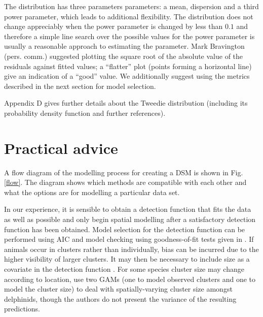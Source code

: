 \documentclass[a4paper,12pt]{article}
\begin{document}
The distribution has three parameters parameters: a mean, dispersion and a third power parameter, which leads to additional flexibility. The distribution does not change appreciably when the power parameter is changed by less than $0.1$ and therefore a simple line search over the possible values for the power parameter is usually a reasonable approach to estimating the parameter. Mark Bravington (pers. comm.) suggested plotting the square root of the absolute value of the residuals against fitted values; a ``flatter'' plot (points forming a horizontal line) give an indication of a ``good'' value. We additionally suggest using the metrics described in the next section for model selection.

Appendix D gives further details about the Tweedie distribution (including its probability density function and further references).

\section*{Practical advice}
\label{s:practical}

A flow diagram of the modelling process for creating a DSM is shown in Fig. \ref{flow}. The diagram shows which methods are compatible with each other and what the options are for modelling a particular data set.

In our experience, it is sensible to obtain a detection function that fits the data as well as possible and only begin spatial modelling after a satisfactory detection function has been obtained. Model selection for the detection function can be performed using AIC and model checking using goodness-of-fit tests given in \citet[Section 11.11]{burnham:2004vd}.  If animals occur in clusters rather than individually, bias can be incurred due to the higher visibility of larger clusters. It may then be necessary to include size as a covariate in the detection function \citep[see][Section 4.8.2.4]{Buckland:2001vm}. For some species cluster size may change according to location, \cite{Ferguson:2006ex} use two GAMs (one to model observed clusters and one to model the cluster size) to deal with spatially-varying cluster size amongst delphinids, though the authors do not present the variance of the resulting predictions.
\end{document}

